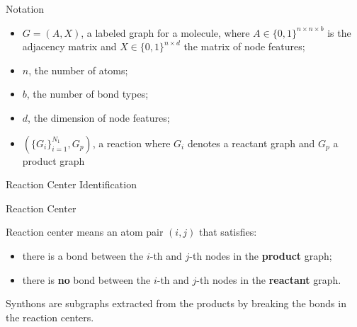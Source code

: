 \documentclass{beamer}		%
\begin{document}
\begin{frame}{Notation}
\begin{itemize}
    \item $G=(A,X)$, a labeled graph for a molecule, where $A \in \{0,1\}^{n \times n \times b}$ is the adjacency matrix and $X \in \{0,1\}^{n \times d}$ the matrix of node features;
    \item $n$, the number of atoms; 
    \item $b$, the number of bond types;
    \item $d$, the dimension of node features;
    \item $(\{G_i\}_{i=1}^{N_1},G_p)$, a reaction where $G_i$ denotes a reactant graph and $G_p$ a product graph
\end{itemize}
\end{frame}







\begin{frame}[noframenumbering]

\begin{itemize}

    \begin{LARGE}
    
    \item {}
    
    \item Reaction Center Identification
    
    \item {}

    \end{LARGE}
    
\end{itemize}
	
\end{frame}







\begin{frame}{Reaction Center}

Reaction center means an atom pair $(i, j)$ that satisfies:

\begin{itemize}
    \item there is a bond between the $i$-th and $j$-th nodes in the \textbf{product} graph;
    \item there is \textbf{no} bond between the $i$-th and $j$-th nodes in the
\textbf{reactant} graph.
\end{itemize}

\pause

Synthons are subgraphs extracted from the products by breaking the bonds in the reaction centers.
    
\end{frame}
\end{document}
